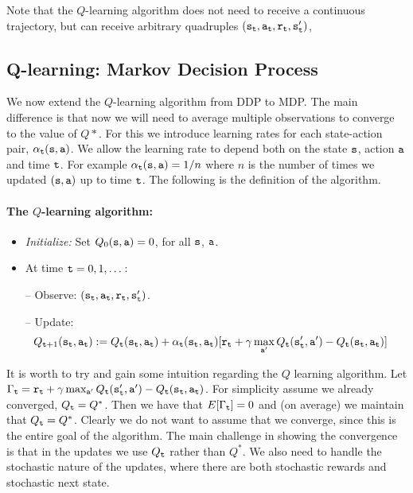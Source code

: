  Note that the $Q$-learning algorithm does
not need to receive a continuous trajectory, but can receive
arbitrary quadruples
$({\tt s}_{\tt t},{\tt a}_{\tt t},{\tt r}_{\tt t},{\tt s}_{{\tt t}}')$,

\subsection{Q-learning: Markov Decision Process}


We now extend the $Q$-learning algorithm from DDP to MDP. The main
difference is that now we will need to average multiple observations
to converge to the value of $Q*$. For this we introduce
learning rates for each state-action pair, $\alpha_{\tt t}({\tt s},{\tt a})$. We allow the
learning rate to depend both on the state ${\tt s}$, action ${\tt a}$
and time ${\tt t}$. For example $\alpha_{\tt t}({\tt s},{\tt a})=1/n$
where $n$ is the number of times we updated $({\tt s},{\tt a})$ up to
time ${\tt t}$. The following is the definition of the algorithm.

\paragraph{The $Q$-learning algorithm:}

\begin{itemize}
\item {\em Initialize:} Set $ Q_0({\tt s},{\tt a})=0$, for all ${\tt s}$, ${\tt a}$.

\item At time ${\tt t}=0,1,\dots$:

-- Observe: $({\tt s}_{\tt t}, {\tt a}_{\tt t}, {\tt r}_{\tt t},
{\tt s}_{{\tt t}}')$.

-- Update: %
\begin{align*}
 Q_{{\tt t}+1}({\tt s}_{\tt t},{\tt a}_{\tt t}) & :=
 Q_{\tt t} ({\tt s}_{\tt t},{\tt a}_{\tt t}) + \alpha_{\tt t}({\tt s}_{\tt t},{\tt a}_{\tt t})  [{\tt r}_{\tt t} +
\gamma \max_{{\tt a}'} Q_{\tt t} ({\tt s}_{{\tt t}}', {\tt a}')
-Q_{\tt t} ({\tt s}_{\tt t},{\tt a}_{\tt t})]
\end{align*}
\end{itemize}


It is worth to try and gain some intuition regarding the $Q$
learning algorithm. Let $\Gamma_{\tt t}= {\tt r}_{\tt t} + \gamma
\max_{{\tt a}'} Q_{\tt t} ({\tt s}_{{\tt t}}', {\tt a}')-Q_{\tt t}
({\tt s}_{\tt t},{\tt a}_{\tt t})$.
%
For simplicity assume we already converged,
%
$Q_{\tt t}=Q^*$. Then we have that $E[\Gamma_{\tt t}]=0$ and (on
average) we maintain that $Q_{\tt t}=Q^*$.
%
Clearly we do not want to assume that we converge, since this is the
entire goal of the algorithm.
%
The main challenge in showing the convergence is that in the updates
we use $Q_{\tt t}$ rather than $Q^*$. We also need to handle the
stochastic nature of the updates, where there are both stochastic
rewards and stochastic next state.

